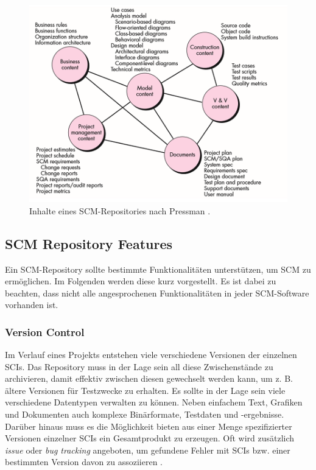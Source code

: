 \documentclass[runningheads,a4paper]{uwsese}
\begin{document}
\begin{figure}
\begin{center}
\includegraphics{graphics/scm_respository_content.png}
\caption{Inhalte eines SCM-Repositories nach Pressman
\cite[p. 591]{Pressman:2009:SEP:1593949}.}
\label{fig:scm_repository_content}
\end{center}
\end{figure}

\subsection{SCM Repository Features}
\label{sec:scm_repo_features}
Ein SCM-Repository sollte bestimmte Funktionalitäten unterstützen, um SCM
zu ermöglichen. Im Folgenden werden diese kurz vorgestellt.
Es ist dabei zu beachten, dass nicht alle angesprochenen Funktionalitäten
in jeder SCM-Software vorhanden ist.

\subsubsection{Version Control}
Im Verlauf eines Projekts entstehen viele verschiedene Versionen der einzelnen
SCIs. Das Repository muss in der Lage sein all diese Zwischenstände zu archivieren,
damit effektiv zwischen diesen gewechselt werden kann, um z. B. ältere Versionen
für Testzwecke zu erhalten.
Es sollte in der Lage sein viele verschiedene Datentypen verwalten
zu können. Neben einfachem Text, Grafiken und Dokumenten auch komplexe Binärformate,
Testdaten und -ergebnisse.
Darüber hinaus muss es die Möglichkeit bieten aus einer Menge spezifizierter
Versionen einzelner SCIs ein Gesamtprodukt zu erzeugen.
Oft wird zusätzlich {\em issue} oder {\em bug tracking} angeboten, um gefundene Fehler
mit SCIs bzw. einer bestimmten Version davon zu assoziieren
\cite[p. 592, 595]{Pressman:2009:SEP:1593949}.
\end{document}

